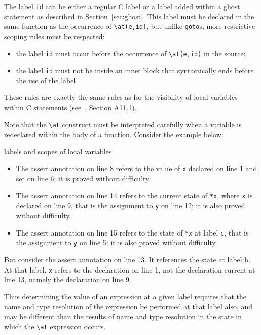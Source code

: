 The label \lstinline|id| can be either a regular C label or a label added
within a ghost statement as described in Section~\ref{sec:ghost}. This
label must be declared in the same function as the occurrence of
\lstinline|\at(e,id)|, but unlike \lstinline|goto|s, more restrictive
scoping rules must be respected:
\begin{itemize}
\item the label \lstinline|id| must occur before the occurrence of
\lstinline|\at(e,id)|
  in the source;
\item the label \lstinline|id| must not be inside an inner block that syntactically ends before the use of the label.
\end{itemize}
These rules are exactly the same rules as for the visibility of local
variables within C statements (see~\cite{KR88}, Section A11.1).

Note that the \lstinline|\at| construct must be interpreted carefully when a variable is redeclared within the body of a function.
Consider the example below:
\begin{example}{labels and scopes of local variables}
\label{redeclaration}

\end{example}
\begin{itemize}
\item The assert annotation on line 8 refers to the value of \lstinline|x| declared on line 1 and set on line 6; it is proved without difficulty.
\item The assert annotation on line 14 refers to the current state of \lstinline|*x|, where \lstinline|x| is declared on line 9, that is the assignment to \lstinline|y| on line 12; it is also proved without difficulty.
\item The assert annotation on line 15 refers to the state of \lstinline|*x| at label \lstinline|c|, that is the assignment to \lstinline|y| on line 5; it is also proved without difficulty.
\end{itemize}
But consider the assert annotation on line 13. It references the state at label b. At that label, \lstinline|x| refers to the declaration on line 1, not the declaration current at line 13, namely the declaration on line 9.

Thus determining the value of an expression at a given label requires that the name and type resolution of the expression be performed at that label also, and may be different than the results of name and type resolution in the state in which the \lstinline|\at| expression occurs.

